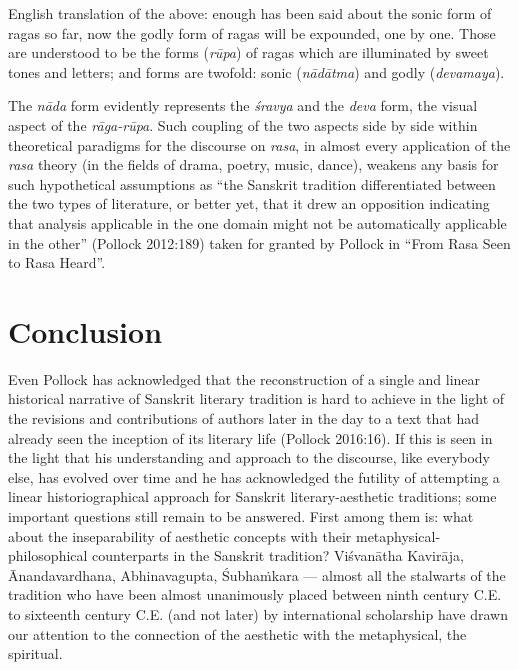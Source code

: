 English translation of the above: enough has been said about the sonic form of ragas so far, now the godly form of ragas will be expounded, one by one. Those are understood to be the forms (\textsl{rūpa}) of ragas which are illuminated by sweet tones and letters; and forms are twofold: sonic (\textsl{nādātma}) and godly (\textsl{devamaya}). 

The \textsl{nāda} form evidently represents the \textsl{śravya} and the \textsl{deva} form, the visual aspect of the \textsl{rāga-rūpa}. Such coupling of the two aspects side by side within theoretical paradigms for the discourse on \textsl{rasa}, in almost every application of the \textsl{rasa} theory (in the fields of drama, poetry, music, dance), weakens any basis for such hypothetical assumptions as “the Sanskrit tradition differentiated between the two types of literature, or better yet, that it drew an opposition indicating that analysis applicable in the one domain might not be automatically applicable in the other” (Pollock 2012:189) taken for granted by Pollock in “From Rasa Seen to Rasa Heard”. 

\section*{Conclusion}

Even Pollock has acknowledged that the reconstruction of a single and linear historical narrative of Sanskrit literary tradition is hard to achieve in the light of the revisions and contributions of authors later in the day to a text that had already seen the inception of its literary life (Pollock 2016:16). If this is seen in the light that his understanding and approach to the discourse, like everybody else, has evolved over time and he has acknowledged the futility of attempting a linear historiographical approach for Sanskrit literary-aesthetic traditions; some important questions still remain to be answered. First among them is: what about the inseparability of aesthetic concepts with their metaphysical-philosophical counterparts in the Sanskrit tradition? Viśvanātha Kavirāja, Ānandavardhana, Abhinavagupta, Śubhaṁkara --- almost all the stalwarts of the tradition who have been almost unanimously placed between ninth century C.E. to sixteenth century C.E. (and not later) by international scholarship have drawn our attention to the connection of the aesthetic with the metaphysical, the spiritual. 

